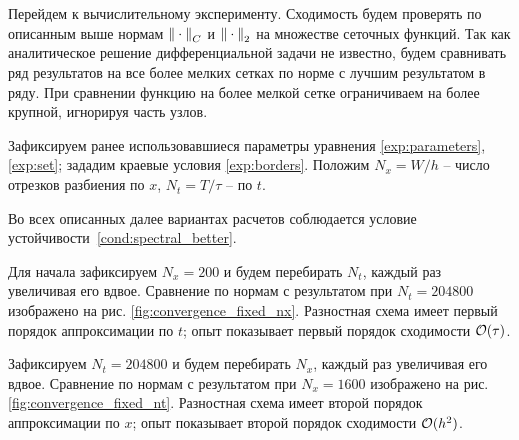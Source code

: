 Перейдем к вычислительному эксперименту. Сходимость будем проверять по описанным выше нормам ${\| \cdot \|}_C$ и ${\| \cdot \|}_2$ на множестве сеточных функций. Так как аналитическое решение дифференциальной задачи не известно, будем сравнивать ряд результатов на все более мелких сетках по норме с лучшим результатом в ряду. При сравнении функцию на более мелкой сетке ограничиваем на более крупной, игнорируя часть узлов.

Зафиксируем ранее использовавшиеся параметры уравнения \eqref{exp:parameters}, \eqref{exp:set}; зададим краевые условия \eqref{exp:borders}. Положим $N_x = W / h$ -- число отрезков разбиения по $x$, $N_t = T / \tau$ -- по $t$.

Во всех описанных далее вариантах расчетов соблюдается условие устойчивости~\eqref{cond:spectral_better}.

Для начала зафиксируем $N_x = 200$ и будем перебирать $N_t$, каждый раз увеличивая его вдвое. Сравнение по нормам с результатом при $N_t = 204800$ изображено на рис. \ref{fig:convergence_fixed_nx}. Разностная схема имеет первый порядок аппроксимации по $t$; опыт показывает первый порядок сходимости ${\mathcal{O}} (\tau)$.

Зафиксируем $N_t = 204800$ и будем перебирать $N_x$, каждый раз увеличивая его вдвое. Сравнение по нормам с результатом при $N_x = 1600$ изображено на рис. \ref{fig:convergence_fixed_nt}. Разностная схема имеет второй порядок аппроксимации по $x$; опыт показывает второй порядок сходимости ${\mathcal{O}} (h^2)$.

